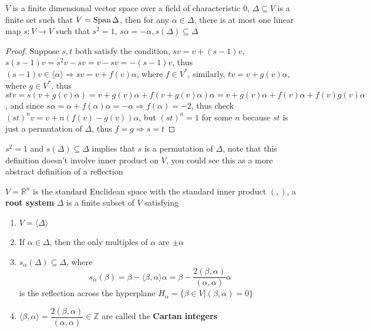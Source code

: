 \documentclass[main]{subfiles}
\begin{document}
\begin{lemma}\label{Delta is finite spaning set of V, then there is at most one s:V->V, maps Delta to Delta, s^2=1 and alpha to -alpha}
$V$ is a finite dimensional vector space over a field of characteristic $0$, $\Delta\subseteq V$ is a finite set such that $V=\operatorname{Span}\Delta$, then for any $\alpha\in\Delta$, there is at most one linear map $s:V\to V$ such that $s^2=1$, $s\alpha=-\alpha,s(\Delta)\subseteq\Delta$
\end{lemma}

\begin{proof}
Suppose $s,t$ both satisfy the condition, $sv=v+(s-1)v$, $s(s-1)v=s^2v-sv=v-sv=-(s-1)v$, thus $(s-1)v\in\langle\alpha\rangle\Rightarrow sv=v+f(v)\alpha$, where $f\in V^*$, similarly, $tv=v+g(v)\alpha$, where $g\in V^*$, thus $stv=s(v+g(v)\alpha)=v+g(v)\alpha+f(v+g(v)\alpha)\alpha=v+g(v)\alpha+f(v)\alpha+f(v)g(v)\alpha$, and since $s\alpha=\alpha+f(\alpha)\alpha=-\alpha\Rightarrow f(\alpha)=-2$, thus check $(st)^nv=v+n(f(v)-g(v))\alpha$, but $(st)^n=1$ for some $n$ because $st$ is just a permutation of $\Delta$, thus $f=g\Rightarrow s=t$
\end{proof}

\begin{remark}
$s^2=1$ and $s(\Delta)\subseteq\Delta$ implies that $s$ is a permutation of $\Delta$, note that this definition doesn't involve inner product on $V$, you could see this as a more abstract definition of a reflection
\end{remark}

\begin{definition}\label{Definition of root system}
$V=\mathbb R^n$ is the standard Euclidean space with the standard inner product $(,)$, a \textbf{root system} $\Delta$ is a finite subset of $V$ satisfying
\begin{enumerate}[leftmargin=*,label=\textbf{\arabic*}.]
\item $V=\langle\Delta\rangle$
\item If $\alpha\in\Delta$, then the only multiples of $\alpha$ are $\pm\alpha$
\item $s_\alpha(\Delta)\subseteq\Delta$, where
\[s_\alpha(\beta)=\beta-\langle\beta,\alpha\rangle\alpha=\beta-\dfrac{2(\beta,\alpha)}{(\alpha,\alpha)}\alpha\]
is the reflection across the hyperplane $H_\alpha=\{\beta\in V|(\beta,\alpha)=0\}$
\item $\langle\beta,\alpha\rangle=\dfrac{2(\beta,\alpha)}{(\alpha,\alpha)}\in\mathbb Z$ are called the \textbf{Cartan integers}
\end{enumerate}
\end{definition}
\end{document}
